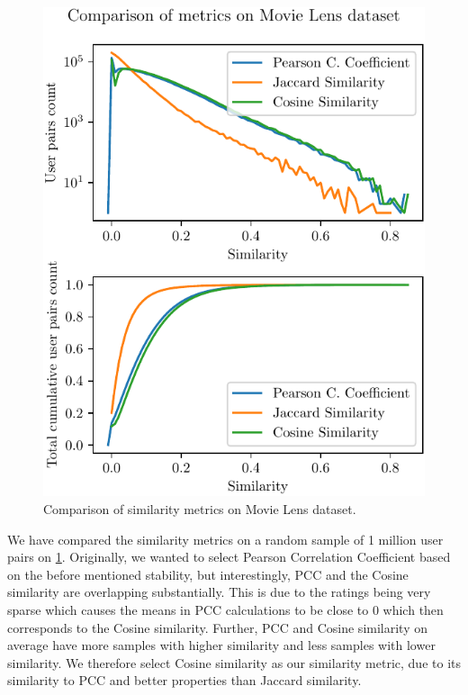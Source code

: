 \begin{figure}[ht!]
    \centering
    \includegraphics{img/figures/similarity_metrics.pdf}
    \caption{Comparison of similarity metrics on Movie Lens dataset.}
    \label{fig:similarity_metrics}
\end{figure}


We have compared the similarity metrics on a random sample of 1 million user pairs on \ref{fig:similarity_metrics}. Originally, we wanted to select Pearson Correlation Coefficient based on the before mentioned stability, but interestingly, PCC and the Cosine similarity are overlapping substantially. This is due to the ratings being very sparse which causes the means in PCC calculations to be close to 0 which then corresponds to the Cosine similarity. Further, PCC and Cosine similarity on average have more samples with higher similarity and less samples with lower similarity. We therefore select Cosine similarity as our similarity metric, due to its similarity to PCC and better properties than Jaccard similarity.

